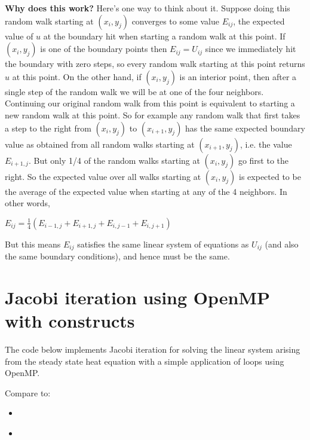 \documentclass[letterpaper,10pt,english]{sphinxmanual}
\begin{document}
\textbf{Why does this work?}  Here's one way to think about it.  Suppose doing this
random walk starting at \((x_i,y_j)\) converges to some value \(E_{ij}\),
the expected value of \(u\) at the boundary hit when starting a random walk at this
point.  If \((x_i,y_j)\) is one of the boundary points then
\(E_{ij} = U_{ij}\) since we immediately hit the boundary with zero
steps, so every random walk starting at this point returns \(u\) at this
point.  On the other hand, if \((x_i,y_j)\) is an interior point, then
after a single step of the random walk we will be at one of the four
neighbors.  Continuing our original random walk from this point is
equivalent to starting a new random walk at this point.  So for example
any random walk that first takes a step to the right from \((x_i,y_j)\)
to \((x_{i+1},y_j)\) has the same expected boundary value as obtained
from all random walks starting at \((x_{i+1},y_j)\), i.e. the value
\(E_{i+1,j}\).  But only 1/4 of the random walks starting at
\((x_i,y_j)\) go first to the right.  So the expected value over all
walks starting at \((x_i,y_j)\) is expected to be the average of the
expected value when starting at any of the 4 neighbors.  In other words,

\(E_{ij} = \frac 1 4 (E_{i-1,j} + E_{i+1,j} + E_{i,j-1} + E_{i,j+1})\)

But this means \(E_{ij}\) satisfies the same linear system of equations
as \(U_{ij}\) (and also the same boundary conditions),
and hence must be the same.


\section{Jacobi iteration using OpenMP with  constructs}
\label{jacobi1d_omp1:jacobi-iteration-using-openmp-with-parallel-do-constructs}\label{jacobi1d_omp1:jacobi1d-omp1}\label{jacobi1d_omp1::doc}
The code below implements Jacobi iteration for solving the linear system
arising from the steady state heat equation
with a simple application of  loops using OpenMP.

Compare to:
\begin{itemize}
\item {} 
{\hyperref[jacobi1d_omp2:jacobi1d\string-omp2]{}}

\item {} 
{\hyperref[jacobi1d_mpi:jacobi1d\string-mpi]{}}

\end{itemize}
\end{document}
